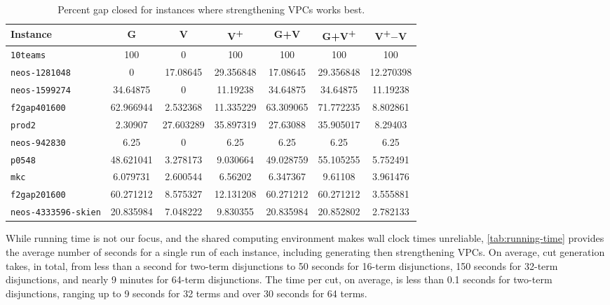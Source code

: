 \documentclass[oribibl,envcountsame]{llncs}
\theoremstyle{remark}
\theoremstyle{definition}
\newcommand{\instance}[1]{\texttt{#1}}
\begin{document}
{
\begin{table}[t]
\renewcommand{\tabcolsep}{.45em}
\centering
\caption{
            Percent gap closed for instances where strengthening VPCs works best.
        }
\label{tab:top5}
\begin{tabular}{@{}
            l
            *{1}{S[table-auto-round,table-format=3.2]}
            *{1}{S[table-auto-round,table-format=2.2]}
            *{4}{S[table-auto-round,table-format=3.2]}
        @{}}
\toprule
{Instance} & {G} & {V} & {V\textsuperscript{+}} & {G+V} & {G+V\textsuperscript{+}} & {V\textsuperscript{+}$-$V}
\\
\midrule
\instance{10teams}            & 100       & 0         & 100       & 100       & 100       & 100       \\
\instance{neos-1281048}       & 0         & 17.08645  & 29.356848 & 17.08645  & 29.356848 & 12.270398 \\
\instance{neos-1599274}       & 34.64875  & 0         & 11.19238  & 34.64875  & 34.64875  & 11.19238  \\
\instance{f2gap401600}        & 62.966944 & 2.532368  & 11.335229 & 63.309065 & 71.772235 & 8.802861  \\
\instance{prod2}              & 2.30907   & 27.603289 & 35.897319 & 27.63088  & 35.905017 & 8.29403   \\
\instance{neos-942830}        & 6.25      & 0         & 6.25      & 6.25      & 6.25      & 6.25      \\
\instance{p0548}              & 48.621041 & 3.278173  & 9.030664  & 49.028759 & 55.105255 & 5.752491  \\
\instance{mkc}                & 6.079731  & 2.600544  & 6.56202   & 6.347367  & 9.61108   & 3.961476  \\
\instance{f2gap201600}        & 60.271212 & 8.575327  & 12.131208 & 60.271212 & 60.271212 & 3.555881  \\
\instance{neos-4333596-skien} & 20.835984 & 7.048222  & 9.830355  & 20.835984 & 20.852802 & 2.782133 
\\
\bottomrule
\end{tabular}
\end{table}
}

While running time is not our focus, and the shared computing environment makes wall clock times unreliable, 
\cref{tab:running-time} provides 
the average number of seconds for a single run of each instance, including generating then strengthening VPCs.
On average, cut generation takes, in total, from less than a second for two-term disjunctions to 50 seconds for 16-term disjunctions, 150 seconds for 32-term disjunctions, and nearly 9 minutes for 64-term disjunctions.
The time per cut, on average, is less than 0.1 seconds for two-term disjunctions, ranging up to 9 seconds for 32 terms and over 30 seconds for 64 terms.
\end{document}

